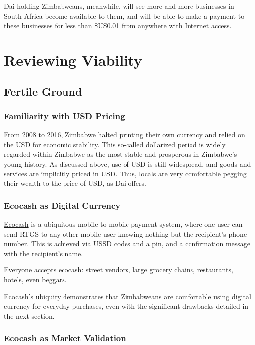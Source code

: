 \documentclass{article}
\begin{document}
Dai-holding Zimbabweans, meanwhile, will see more and more businesses in South Africa become available to them, and will be able to make a payment to these businesses for less than \$US0.01 from anywhere with Internet access.

\newpage
\section{Reviewing Viability} \label{viability}

\subsection{Fertile Ground} \label{fertile}

\subsubsection{Familiarity with USD Pricing} \label{familiar with usd}

From 2008 to 2016, Zimbabwe halted printing their own currency and relied on the USD for economic stability. This so-called \href{https://www.voanews.com/africa/zimbabwe-ends-decade-dollarization-new-currency-reform}{dollarized period} is widely regarded within Zimbabwe as the most stable and prosperous in Zimbabwe's young history. As discussed above, use of USD is still widespread, and goods and services are implicitly priced in USD. Thus, locals are very comfortable pegging their wealth to the price of USD, as Dai offers.

\subsubsection{Ecocash as Digital Currency} \label{ecocash digital}

\href{https://en.wikipedia.org/wiki/EcoCash}{Ecocash} is a ubiquitous mobile-to-mobile payment system, where one user can send RTGS to any other mobile user knowing nothing but the recipient's phone number. This is achieved via USSD codes and a pin, and a confirmation message with the recipient's name.

Everyone accepts ecocash: street vendors, large grocery chains, restaurants, hotels, even beggars.

Ecocash's ubiquity demonstrates that Zimbabweans are comfortable using digital currency for everyday purchases, even with the significant drawbacks detailed in the next section.

\subsubsection{Ecocash as Market Validation} \label{ecocash market}
\end{document}
